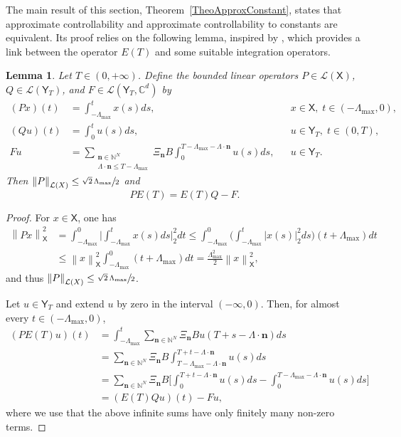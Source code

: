 \documentclass[10pt]{article}
\newcommand{\bn}{\boldsymbol{n}}
\theoremstyle{plain}
\newtheorem{lemm}[theo]{Lemma}
\theoremstyle{definition}
\newcommand{\norm}[1]{\left\lVert #1\right\lVert}
\newcommand{\abs}[1]{\left\lvert #1\right \rvert}
\newcommand{\bgabs}[1]{\biggl\lvert #1\biggr \rvert}
\numberwithin{equation}{section}\numberwithin{figure}{section}\emergencystretch=3em
\begin{document}
The main result of this section, Theorem~\ref{TheoApproxConstant}, states that approximate controllability and approximate controllability to constants are equivalent. Its proof relies on the following lemma, inspired by \cite[Th.\,5.1]{Gohberg1989Inversion}, which provides a link between the operator $E(T)$ and some suitable integration operators.

\begin{lemm}
\label{LemmPETETQF}
Let $T \in (0, +\infty)$. Define the bounded linear operators $P \in \mathcal L(\mathsf X)$, $Q \in \mathcal L(\mathsf Y_T)$, and $F \in \mathcal L(\mathsf Y_T, \mathbb C^d)$ by
\begin{align*}
(P x)(t) & = \int_{-\Lambda_{\max}}^t x(s) ds, & & x \in \mathsf X,\; t \in (-\Lambda_{\max}, 0),  \\
(Q u)(t) & = \int_0^t u(s) ds, & & u \in \mathsf Y_T,\; t \in (0, T),  \\
F u & = \sum_{\substack{\bn \in \mathbb N^N \\ \Lambda \cdot \bn \leq T - \Lambda_{\max}}} \Xi_{\bn} B \int_0^{T - \Lambda_{\max} - \Lambda \cdot \bn} u(s) ds, & & u \in \mathsf Y_T.
\end{align*}
Then $\norm{P}_{\mathcal L(X)} \leq \sfrac{\sqrt{2}\,\Lambda_{\max}}{2}$ and
\begin{equation}
\label{EqPETETQF}
P E(T) = E(T) Q - F.
\end{equation}
\end{lemm}

\begin{proof}
For $x \in \mathsf X$, one has
\begin{align*}
\norm{P x}_{\mathsf X}^2 & = \int_{-\Lambda_{\max}}^0 \bgabs{\int_{-\Lambda_{\max}}^t x(s) ds}_2^2 dt \leq \int_{-\Lambda_{\max}}^0 \biggl(\int_{-\Lambda_{\max}}^t \abs{x(s)}_2^2 ds\biggr) (t + \Lambda_{\max}) dt  \\
& \leq \norm{x}_{\mathsf X}^2 \int_{-\Lambda_{\max}}^0 (t + \Lambda_{\max}) dt = \frac{\Lambda_{\max}^2}{2} \norm{x}_{\mathsf X}^2,
\end{align*}
and thus $\norm{P}_{\mathcal L(X)} \leq \sfrac{\sqrt{2}\,\Lambda_{\max}}{2}$.

Let $u \in \mathsf Y_T$ and extend $u$ by zero in the interval $(-\infty, 0)$. Then, for almost every $t \in (-\Lambda_{\max}, 0)$,
\begin{align*}
(P E(T) u)(t) & = \int_{-\Lambda_{\max}}^t \sum_{\bn \in \mathbb N^N} \Xi_{\bn} B u(T + s - \Lambda \cdot \bn) ds  \\
& = \sum_{\bn \in \mathbb N^N} \Xi_{\bn} B \int_{T - \Lambda_{\max} - \Lambda \cdot \bn}^{T + t - \Lambda \cdot \bn} u(s) ds  \\
& = \sum_{\bn \in \mathbb N^N} \Xi_{\bn} B \biggl[\int_0^{T + t - \Lambda \cdot \bn} u(s) ds - \int_0^{T - \Lambda_{\max} - \Lambda \cdot \bn} u(s) ds\biggr]  \\
& = (E(T) Q u)(t) - F u,
\end{align*}
where we use that the above infinite sums have only finitely many non-zero terms.
\end{proof}
\end{document}
